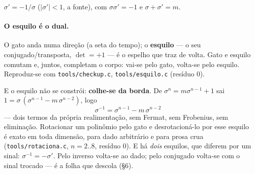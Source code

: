 \documentclass[11pt]{article}
\newcommand{\code}[1]{\texttt{\small #1}}
\theoremstyle{plain}
\theoremstyle{remark}
\begin{document}
$\sigma'=-1/\sigma$ ($|\sigma'|<1$, a fonte), com $\sigma\sigma'=-1$ e $\sigma+\sigma'=m$.

\paragraph{O esquilo é o dual.} O gato anda numa direção (a seta do tempo); o \textbf{esquilo} ---
o seu conjugado/transposta, $\det=+1$ --- é o espelho que traz de volta. Gato e esquilo comutam e,
juntos, completam o corpo: vai-se pelo gato, volta-se pelo esquilo. Reproduz-se com
\code{tools/checkup.c}, \code{tools/esquilo.c} (resíduo $0$).

E o esquilo não se constrói: \textbf{colhe-se da borda}. De $\sigma^n=m\sigma^{n-1}+1$ sai
$1=\sigma\,(\sigma^{n-1}-m\,\sigma^{n-2})$, logo
\[
 \sigma^{-1}=\sigma^{n-1}-m\,\sigma^{n-2}
\]
--- dois termos da própria realimentação, sem Fermat, sem Frobenius, sem eliminação. Rotacionar um
polinômio pelo gato e desrotacioná-lo por esse esquilo é exato em toda dimensão, para dado arbitrário
e para prosa crua (\code{tools/rotaciona.c}, $n=2..8$, resíduo $0$). E há \emph{dois} esquilos, que
diferem por um sinal: $\sigma^{-1}=-\sigma'$. Pelo inverso volta-se ao dado; pelo conjugado volta-se
com o sinal trocado --- é a folha que descola (§6).
\end{document}
